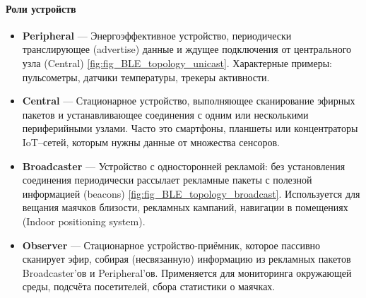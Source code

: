 \documentclass[a4paper,12pt]{article}
\begin{document}
\paragraph{Роли устройств}
\begin{itemize}
  \item \textbf{Peripheral} — Энергоэффективное устройство, периодически транслирующее (advertise) данные и ждущее подключения от центрального узла (Central) \ref{fig:fig_BLE_topology_unicast}. Характерные примеры: пульсометры, датчики температуры, трекеры активности.
  \item \textbf{Central} — Стационарное устройство, выполняющее сканирование эфирных пакетов и устанавливающее соединения с одним или несколькими периферийными узлами. Часто это смартфоны, планшеты или концентраторы IoT--сетей, которым нужны данные от множества сенсоров.
  \item \textbf{Broadcaster} — Устройство с односторонней рекламой: без установления соединения периодически рассылает рекламные пакеты с полезной информацией (beacons) \ref{fig:fig_BLE_topology_broadcast}. Используется для вещания маячков близости, рекламных кампаний, навигации в помещениях (Indoor positioning system).
  \item \textbf{Observer} — Стационарное устройство-приёмник, которое пассивно сканирует эфир, собирая (несвязанную) информацию из рекламных пакетов Broadcaster’ов и Peripheral’ов. Применяется для мониторинга окружающей среды, подсчёта посетителей, сбора статистики о маячках.
\end{itemize}
\end{document}

